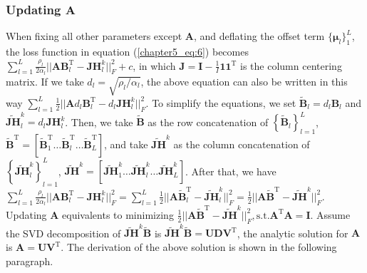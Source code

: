 \subsubsection*{Updating $\mathbf{A}$}
When fixing all other parameters except $\mathbf{A}$, and deflating the offset term $\{ \bm{\mu}_l \}_{1}^{L}$, the loss function in equation (\ref{chapter5_eq:6}) becomes $\sum_{l=1}^{L} \frac{\rho_l}{2\alpha_l} ||\mathbf{AB}_l^{\text{T}} - \mathbf{JH}_{l}^{k}||_F^2 + c$, in which $\mathbf{J} = \mathbf{I} - \frac{1}{I} \mathbf{1} \mathbf{1}^{\text{T}}$ is the column centering matrix. If we take $d_l = \sqrt{\rho_l /\alpha_l}$, the above equation can also be written in this way $\sum_{l=1}^{L} \frac{1}{2} ||\mathbf{A}d_l\mathbf{B}_l^{\text{T}} - d_l\mathbf{JH}_{l}^{k}||_F^2$. To simplify the equations, we set $\widetilde{\mathbf{B}}_l = d_l \mathbf{B}_l$ and $\widetilde{\mathbf{JH}}_l^k = d_l \mathbf{JH}_{l}^{k}$. Then, we take $\widetilde{\mathbf{B}}$ as the row concatenation of $\left\{ \widetilde{\mathbf{B}}_l \right\}_{l=1}^{L}$, $\widetilde{\mathbf{B}}^{\text{T}} = [\widetilde{\mathbf{B}}_1^{\text{T}}  \ldots \widetilde{\mathbf{B}}_l^{\text{T}} \ldots \widetilde{\mathbf{B}}_L^{\text{T}}]$, and take $\widetilde{\mathbf{JH}}^k$ as the column concatenation of $\left\{\widetilde{\mathbf{JH}}_l^k \right\}_{l=1}^{L}$, $\widetilde{\mathbf{JH}}^k = [\widetilde{\mathbf{JH}}_1^k \ldots \widetilde{\mathbf{JH}}_l^k \ldots \widetilde{\mathbf{JH}}_L^k]$. After that, we have $\sum_{l=1}^{L} \frac{\rho_l}{2\alpha_l} ||\mathbf{AB}_l^{\text{T}} - \mathbf{JH}_{l}^{k}||_F^2 = \sum_{l=1}^{L} \frac{1}{2} ||\mathbf{A}\widetilde{\mathbf{B}}_l^{\text{T}} - \widetilde{\mathbf{JH}}_{l}^{k}||_F^2 = \frac{1}{2}||\mathbf{A}\widetilde{\mathbf{B}}^{\text{T}} - \widetilde{\mathbf{JH}}^{k}||_F^2$. Updating $\mathbf{A}$ equivalents to minimizing $\frac{1}{2}||\mathbf{A}\widetilde{\mathbf{B}}^{\text{T}} - \widetilde{\mathbf{JH}}^{k}||_F^2, \text{s.t.} \mathbf{A}^{\text{T}}\mathbf{A} = \mathbf{I}$. Assume the SVD decomposition of $\widetilde{\mathbf{JH}}^{k}\widetilde{\mathbf{B}}$ is $\widetilde{\mathbf{JH}}^{k}\widetilde{\mathbf{B}} = \mathbf{UDV}^{\text{T}}$, the analytic solution for $\mathbf{A}$ is $\mathbf{A} = \mathbf{UV}^{\text{T}}$. The derivation of the above solution is shown in the following paragraph.

